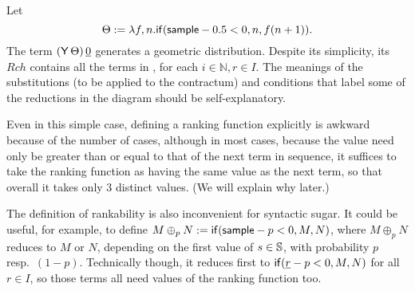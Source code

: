 \begin{example}
Let
\[
\Theta := \lambda f, n. \mathsf{if}(\mathsf{sample} - 0.5 < 0, n, f (n+1)). 
\]
The term  $(\mathsf{Y} \, \Theta) \, \underline 0$ generates a geometric distribution.
Despite its simplicity, its $\mathit{Rch}$ contains all the terms in , for each $i \in \mathbb N, r \in I$.
The meanings of the substitutions (to be applied to the contractum) and conditions that label some of the reductions in the diagram should be self-explanatory.

\end{example}

Even in this simple case, defining a ranking function explicitly is awkward because of the number of cases, although in most cases, because the value need only be greater than or equal to that of the next term in sequence, it suffices to take the ranking function as having the same value as the next term, so that overall it takes only 3 distinct values.
(We will explain why later.)

The definition of rankability is also inconvenient for syntactic sugar. It could be useful, for example, to define $M \oplus_p N := \mathsf{if}(\mathsf{sample} - p < 0, M, N)$, where $M \oplus_p N$ reduces to $M$ or $N$, depending on the first value of $s \in {\mathbb{S}}$, with probability $p$ resp.~$(1-p)$. Technically though, it reduces first to $\mathsf{if}(\underline r - p < 0, M, N)$ for all $r \in I$, so those terms all need values of the ranking function too.

